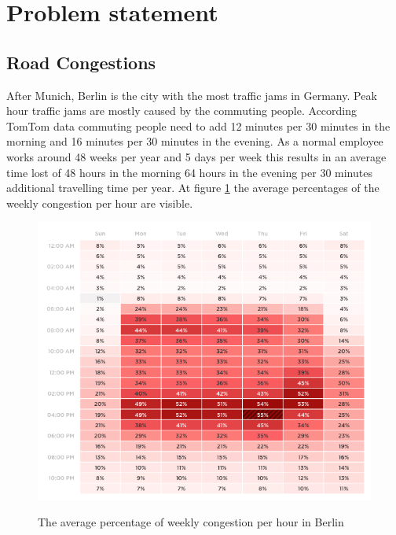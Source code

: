 \section{Problem statement}
\subsection{Road Congestions}
After Munich, Berlin is the city with the most traffic jams in Germany. Peak hour traffic jams are mostly caused by the commuting people. According TomTom \cite{tomtom} data commuting people need to add 12 minutes per 30 minutes in the morning and 16 minutes per 30 minutes in the evening. As a normal employee works around 48 weeks per year and 5 days per week this results in an average time lost of 48 hours in the morning 64 hours in the evening per 30 minutes additional travelling time per year. At figure \ref{averageCongestion} the average percentages of the weekly congestion per hour are visible.

\begin{figure}[h!]
	\centering
	\includegraphics[width=0.55\textheight]{ProblemsFigures/TOMTOMWeeklyAverageCongestion}
	\label{averageCongestion}
	\caption{The average percentage of weekly congestion per hour in Berlin }
\end{figure}

